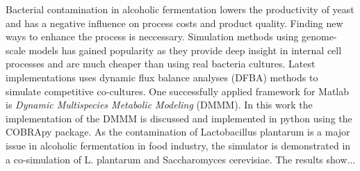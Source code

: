 Bacterial contamination in alcoholic fermentation lowers the productivity of yeast and has a negative
influence on process costs and product quality. Finding new ways to enhance the process is neccessary.
Simulation methods using genome-scale models has gained popularity as they provide deep insight in
internal cell processes and are much cheaper than using real bacteria cultures. Latest implementations
uses dynamic flux balance analyses (DFBA) methods to simulate competitive co-cultures.
One successfully applied framework for Matlab is \textit{Dynamic Multispecies Metabolic Modeling}
(DMMM). In this work the implementation of the DMMM is discussed and implemented in python using
the COBRApy package. As the contamination of Lactobacillus plantarum is a major issue in alcoholic
fermentation in food industry, the simulator is demonstrated in a co-simulation of L. plantarum
and Saccharomyces cerevisiae. The results show...

